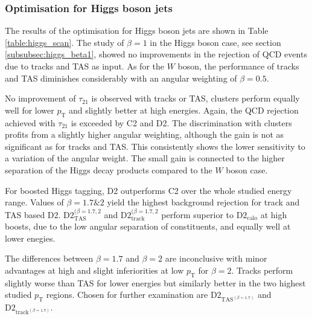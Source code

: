 \subsubsection{Optimisation for Higgs boson jets}
The results of the optimisation for Higgs boson jets are shown in Table \ref{table:higgs_scan}. The study of $\beta=1$ in the Higgs boson case, see section \ref{subsubsec:higgs_beta1}, showed no improvements in the rejection of QCD events due to tracks and TAS as input. As for the $W$ boson, the performance of tracks and TAS diminishes considerably with an angular weighting of $\beta=0.5$.

No improvement of $\tau_{21}$ is observed with tracks or TAS, clusters perform equally well for lower $p_{\mathrm{T}}$ and slightly better at high energies. Again, the QCD rejection achieved with $\tau_{21}$ is exceeded by C2 and D2. The discrimination with clusters profits from a slightly higher angular weighting, although the gain is not as significant as for tracks and TAS. This consistently shows the lower sensitivity to a variation of the angular weight. The small gain is connected to the higher separation of the Higgs decay products compared to the $W$ boson case.

For boosted Higgs tagging, D2 outperforms C2 over the whole studied energy range. Values of $\beta=1.7 \& 2$ yield the highest background rejection for track and TAS based D2. $\text{D2}_{\text{TAS}}^{(\beta=1.7,2}$ and $\text{D2}_{\text{track}}^{(\beta=1.7,2}$ perform superior to $\text{D2}_{\text{calo}}$ at high boosts, due to the low angular separation of constituents, and equally well at lower enegies.

The differences between $\beta=1.7$ and $\beta=2$ are inconclusive with minor advantages at high and slight inferiorities at low $p_{\mathrm{T}}$ for $\beta=2$. Tracks perform slightly worse than TAS for lower energies but similarly better in the two highest studied $p_{\mathrm{T}}$ regions. Chosen for further examination are $\text{D2}_{\text{TAS}^{(\beta=1.7)}}$ and $\text{D2}_{\text{track}^{(\beta=1.7)}}$.

